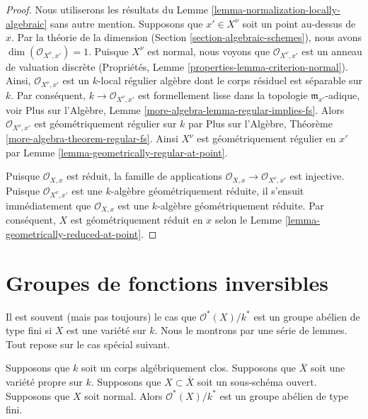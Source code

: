\begin{proof}
Nous utiliserons les résultats du Lemme
\ref{lemma-normalization-locally-algebraic} sans autre mention.
Supposons que $x' \in X^\nu$ soit un point au-dessus de $x$. Par
la théorie de la dimension (Section
\ref{section-algebraic-schemes}), nous avons
$\dim(\mathcal{O}_{X^\nu, x'}) = 1$. Puisque $X^\nu$ est normal,
nous voyons que $\mathcal{O}_{X^\nu, x'}$ est un anneau de valuation
discrète (Propriétés, Lemme \ref{properties-lemma-criterion-normal}).
Ainsi, $\mathcal{O}_{X^\nu, x'}$ est un $k$-local régulier algèbre
dont le corps résiduel est séparable sur $k$. Par conséquent, $k \to
\mathcal{O}_{X^\nu, x'}$ est formellement lisse dans la topologie
$\mathfrak m_{x'}$-adique, voir Plus sur l'Algèbre, Lemme
\ref{more-algebra-lemma-regular-implies-fs}. Alors $\mathcal{O}_{X^\nu,
x'}$ est géométriquement régulier sur $k$ par Plus sur l'Algèbre,
Théorème \ref{more-algebra-theorem-regular-fs}. Ainsi $X^\nu$ est
géométriquement régulier en $x'$ par Lemme \ref{lemma-geometrically-regular-at-point}.

\medskip\noindent
Puisque $\mathcal{O}_{X, x}$ est réduit, la famille de applications
$\mathcal{O}_{X, x} \to \mathcal{O}_{X^\nu, x'}$ est injective.
Puisque $\mathcal{O}_{X^\nu, x'}$ est une $k$-algèbre géométriquement
réduite, il s'ensuit immédiatement que $\mathcal{O}_{X, x}$ est une
$k$-algèbre géométriquement réduite. Par conséquent, $X$ est
géométriquement réduit en $x$ selon le Lemme \ref{lemma-geometrically-reduced-at-point}.
\end{proof}









\section{Groupes de fonctions inversibles}
\label{section-units}

\noindent
Il est souvent (mais pas toujours) le cas que
$\mathcal{O}^*(X)/k^*$ est un groupe abélien de type fini
si $X$ est une variété sur $k$. Nous le montrons par une
série de lemmes. Tout repose sur le cas spécial suivant.

\begin{lemma}
\label{lemma-open-in-normal-proper}
Supposons que $k$ soit un corps algébriquement clos.
Supposons que $\overline{X}$ soit une variété propre sur
$k$. Supposons que $X \subset \overline{X}$ soit un
sous-schéma ouvert. Supposons que $X$ soit normal. Alors
$\mathcal{O}^*(X)/k^*$ est un groupe abélien de type fini.
\end{lemma}

